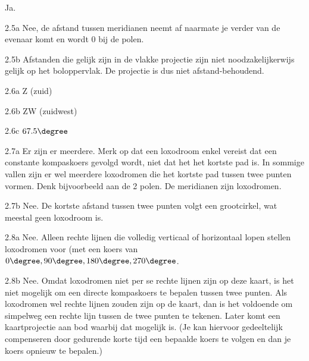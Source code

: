\begin{Antwoord}{2.4}
		Ja.
	
\end{Antwoord}
\begin{Antwoord}{2.5a}
			Nee, de afstand tussen meridianen neemt af naarmate je verder van de evenaar komt en wordt 0 bij de polen.
		
\end{Antwoord}
\begin{Antwoord}{2.5b}
			Afstanden die gelijk zijn in de vlakke projectie zijn niet noodzakelijkerwijs gelijk op het boloppervlak. De projectie is dus niet afstand-behoudend.
		
\end{Antwoord}
\begin{Antwoord}{2.6a}
			Z (zuid)
		
\end{Antwoord}
\begin{Antwoord}{2.6b}
			ZW (zuidwest)
		
\end{Antwoord}
\begin{Antwoord}{2.6c}
			$67.5\degree$
		
\end{Antwoord}
\begin{Antwoord}{2.7a}
			Er zijn er meerdere. Merk op dat een loxodroom enkel vereist dat een constante kompaskoers gevolgd wordt, niet dat het het kortste pad is. In sommige vallen zijn er wel meerdere loxodromen die het kortste pad tussen twee punten vormen. Denk bijvoorbeeld aan de 2 polen. De meridianen zijn loxodromen.
		
\end{Antwoord}
\begin{Antwoord}{2.7b}
			Nee. De kortste afstand tussen twee punten volgt een grootcirkel, wat meestal geen loxodroom is.
		
\end{Antwoord}
\begin{Antwoord}{2.8a}
			Nee. Alleen rechte lijnen die volledig verticaal of horizontaal lopen stellen loxodromen voor (met een koers van $0\degree, 90\degree, 180\degree, 270\degree$.
		
\end{Antwoord}
\begin{Antwoord}{2.8b}
			Nee. Omdat loxodromen niet per se rechte lijnen zijn op deze kaart, is het niet mogelijk om een directe kompaskoers te bepalen tussen twee punten. Als loxodromen wel rechte lijnen zouden zijn op de kaart, dan is het voldoende om simpelweg een rechte lijn tussen de twee punten te tekenen. Later komt een kaartprojectie aan bod waarbij dat mogelijk is. (Je kan hiervoor gedeeltelijk compenseren door gedurende korte tijd een bepaalde koers te volgen en dan je koers opnieuw te bepalen.)
		
\end{Antwoord}
